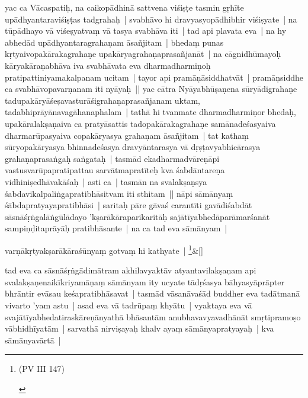 \documentclass[article,a4paper]{memoir}
\begin{document}
	  \pstart yac ca Vā\-caspatiḥ, na caikopā\-dhinā\- sattvena viśiṣṭe tasmin gṛhī\-te upā\-dhyantaraviśiṣṭas tadgrahaḥ | svabhā\-vo hi dravyasyopā\-dhibhir viśiṣyate | na tū\-pā\-dhayo vā\- viśeṣyatvaṃ vā\- tasya svabhā\-va iti | tad api plavata eva | na hy abhedā\-d upā\-dhyantaragrahaṇam ā\-sañjitam | bhedaṃ punas kṛtyaivopakā\-rakagrahaṇe upakā\-ryagrahaṇaprasañjanā\-t | na cā\-gnidhū\-mayoḥ kā\-ryakā\-raṇabhā\-va iva svabhā\-vata eva dharmadharmiṇoḥ pratipattiniyamakalpanam ucitam | tayor api pramā\-ṇā\-siddhatvā\-t | pramā\-ṇsiddhe ca svabhā\-vopavarṇanam iti nyā\-yaḥ || \label{thakur75-63.3} yac cā\-tra Nyā\-yabhū\-ṣaṇena sū\-ryā\-digrahaṇe tadupakā\-ryā\-śeṣavasturā\-śigrahaṇaprasañjanam uktam, tadabhiprā\-yā\-navagā\-hanaphalam | tathā\- hi tvanmate dharmadharmiṇor bhedaḥ, upakā\-ralakṣaṇaiva ca pratyā\-sattis tadopakā\-rakagrahaṇe samā\-nadeśasyaiva dharmarū\-pasyaiva copakā\-ryasya grahaṇam ā\-sañjitam | tat kathaṃ sū\-ryopakā\-ryasya bhinnadeśasya dravyā\-ntarasya vā\- dṛṣṭavyabhicā\-rasya grahaṇaprasaṅgaḥ saṅgataḥ | tasmā\-d ekadharmadvā\-reṇā\-pi vastusvarū\-papratipattau sarvā\-tmapratī\-teḥ kva śabdā\-ntareṇa vidhiniṣedhā\-vakā\-śaḥ | asti ca | tasmā\-n na svalakṣaṇsya śabdavikalpaliṅgapratibhā\-sitvam iti sthitam || \label{thakur75-63.10} nā\-pi sā\-mā\-nyaṃ śā\-bdapratyayapratibhā\-si | saritaḥ pā\-re gā\-vaś carantī\-ti gavā\-diśabdā\-t sā\-snā\-śṛṅgalā\-ṅgū\-lā\-dayo 'kṣarā\-kā\-raparikaritā\-ḥ sajā\-tī\-yabhedā\-parā\-marśanā\-t sampiṇḍitaprā\-yā\-ḥ pratibhā\-sante | na ca tad eva sā\-mā\-nyam |
	\pend
      
	    
	    \stanza[\smallbreak]
varṇā\-kṛtyakṣarā\-kā\-raśū\-nyaṃ gotvaṃ hi kathyate | \footnote{\begin{english}(PV III 147)\end{english}}\&[\smallbreak]


	

	  \pstart tad eva ca sā\-snā\-śṛṅgā\-dimā\-tram akhilavyaktā\-v atyantavilakṣaṇam api svalakṣaṇenaikī\-kriyamā\-ṇaṃ sā\-mā\-nyam ity ucyate tā\-dṛśasya bā\-hyasyā\-prā\-pter bhrā\-ntir evā\-sau keśapratibhā\-savat | tasmā\-d vā\-sanā\-vaśā\-d buddher eva tadā\-tmanā\- vivarto 'yam astu | asad eva vā\- tadrū\-paṃ khyā\-tu | vyaktaya eva vā\- svajā\-tī\-yabhedatiraskā\-reṇā\-nyathā\- bhā\-santā\-m anubhavavyavadhā\-nā\-t smṛtipramoṣo vā\-bhidhī\-yatā\-m | sarvathā\- nirviṣayaḥ khalv ayaṃ sā\-mā\-nyapratyayaḥ | kva sā\-mā\-nyavā\-rtā\- | 
	\pend
      
\end{document}
